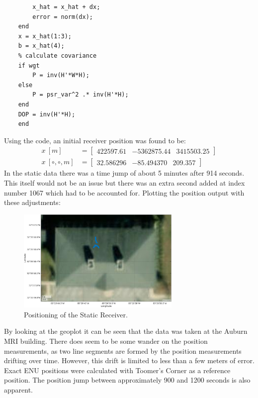 \documentclass[11pt]{article}
\begin{document}
\begin{enumerate}[label=\textbf{\arabic*.}]
\begin{lstlisting}
        x_hat = x_hat + dx;
        error = norm(dx);
    end
    x = x_hat(1:3);
    b = x_hat(4);
    % calculate covariance
    if wgt
        P = inv(H'*W*H);
    else
        P = psr_var^2 .* inv(H'*H);
    end
    DOP = inv(H'*H);
    end    
  \end{lstlisting}
  Using the code, an initial receiver position was found to be: 
  \begin{equation*}
    \begin{split}
      x \:\si{[m]} &= 
      \begin{bmatrix}
        422597.61 & -5362875.44 & 3415503.25
      \end{bmatrix} \\
      x \:\si{[\circ, \circ, m]} &=
      \begin{bmatrix}
        32.586296 & -85.494370 & 209.357
      \end{bmatrix}
    \end{split}
  \end{equation*}
  In the static data there was a time jump of about 5 minutes after 914 seconds. This itself 
  would not be an issue but there was an extra second added at index number 1067 which had 
  to be accounted for. Plotting the position output with these adjustments:
  \begin{figure}[H]
    \centering
    \includegraphics[width=0.7\textwidth]{static_pos.png}
    \caption{Positioning of the Static Receiver.}
  \end{figure}
  By looking at the geoplot it can be seen that the data was taken at the Auburn MRI 
  building. There does seem to be some wander on the position measurements, as 
  two line segments are formed by the position measurements drifting over time. 
  However, this drift is limited to less than a few meters of error. Exact ENU 
  positions were calculated with Toomer's Corner as a reference position. The position 
  jump between approximately 900 and 1200 seconds is also apparent.

\end{enumerate}
\end{document}
